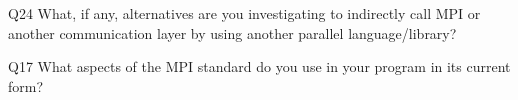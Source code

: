 \begin{description}%
\item{Q24} What, if any, alternatives are you investigating to indirectly call MPI or another communication layer by using another parallel language/library?%
\item{Q17} What aspects of the MPI standard do you use in your program in its current form?%
\end{description}%
